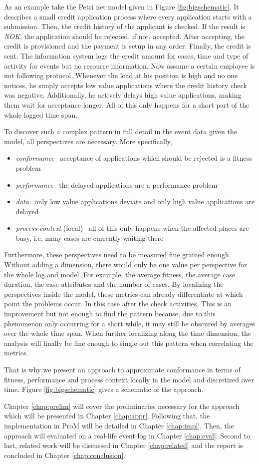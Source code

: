 As an example take the Petri net model given in Figure \ref{fig:bigschematic}. It describes a small credit application process where every application starts with a submission. Then, the credit history of the applicant is checked. If the result is \emph{NOK}, the application should be rejected, if not, accepted. After accepting, the credit is provisioned and the payment is setup in any order. Finally, the credit is sent. The information system logs the credit amount for cases, time and type of activity for events but no resource information. Now assume a certain employee is not following protocol. Whenever the load at his position is high and no one notices, he simply accepts low value applications where the credit history check was negative. Additionally, he actively delays high value applications, making them wait for acceptance longer. All of this only happens for a short part of the whole logged time span.

To discover such a complex pattern in full detail in the event data given the model, all perspectives are necessary. More specifically,
\begin{itemize}
    \item \emph{conformance} \textemdash \ acceptance of applications which should be rejected is a fitness problem
    \item \emph{performance} \textemdash \ the delayed applications are a performance problem
    \item \emph{data} \textemdash \ only low value applications deviate and only high value applications are delayed
    \item \emph{process context} (local) \textemdash \ all of this only happens when the affected places are busy, i.e. many cases are currently waiting there
\end{itemize}
Furthermore, these perspectives need to be measured fine grained enough. Without adding a dimension, there would only be one value per perspective for the whole log and model. For example, the average fitness, the average case duration, the case attributes and the number of cases.
By localizing the perspectives inside the model, these metrics can already differentiate at which point the problems occur. In this case after the check activities. This is an improvement but not enough to find the pattern because, due to this phenomenon only occurring for a short while, it may still be obscured by averages over the whole time span. When further localizing along the time dimension, the analysis will finally be fine enough to single out this pattern when correlating the metrics.

That is why we present an approach to approximate conformance in terms of fitness, performance and process context locally in the model and discretized over time. Figure \ref{fig:bigschematic} gives a schematic of the approach.

Chapter \ref{chap:prelim} will cover the preliminaries necessary for the approach which will be presented in Chapter \ref{chap:appr}. Following that, the implementation in ProM will be detailed in Chapter \ref{chap:impl}. Then, the approach will evaluated on a real-life event log in Chapter \ref{chap:eval}. Second to last, related work will be discussed in Chapter \ref{chap:related} and the report is concluded in Chapter \ref{chap:conclusion}.